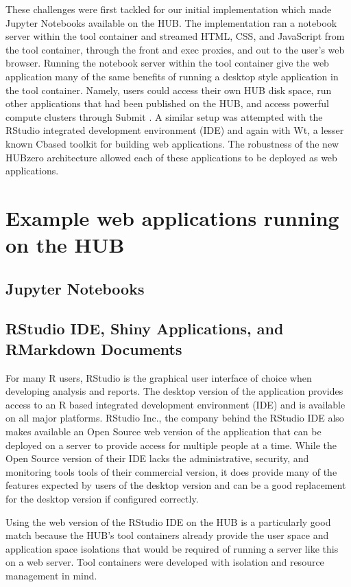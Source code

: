 \documentclass[conference]{../sty/IEEEtran}
\newcommand\CC{C\nolinebreak[4]\hspace{-.05em}\raisebox{.4ex}{\relsize{-3}{\textbf{++}}}\hspace{.25em}}
\begin{document}
These challenges were first tackled for our initial implementation which made
Jupyter Notebooks available on the HUB. The implementation ran a notebook
server within the tool container and streamed HTML, CSS, and JavaScript from
the tool container, through the front and exec proxies, and out to the user's
web browser. Running the notebook server within the tool container give the web
application many of the same benefits of running a desktop style application in
the tool container. Namely, users could access their own HUB disk space, run
other applications that had been published on the HUB, and access powerful
compute clusters through Submit \cite{submit}. A similar setup was attempted
with the RStudio integrated development environment (IDE) and again with Wt, a
lesser known \CC based toolkit for building web applications. The robustness of
the new HUBzero architecture allowed each of these applications to be deployed
as web applications.

\section {Example web applications running on the HUB}

\subsection {Jupyter Notebooks}

\subsection {RStudio IDE, Shiny Applications, and RMarkdown Documents}

For many R users, RStudio is the graphical user interface of choice when
developing analysis and reports. The desktop version of the application
provides access to an R based integrated development environment (IDE) and is
available on all major platforms. RStudio Inc., the company behind the RStudio
IDE also makes available an Open Source web version of the application that can
be deployed on a server to provide access for multiple people at a time. While
the Open Source version of their IDE lacks the administrative, security, and
monitoring tools tools of their commercial version, it does provide many of the
features expected by users of the desktop version and can be a good replacement
for the desktop version if configured correctly.

Using the web version of the RStudio IDE on the HUB is a particularly good
match because the HUB's tool containers already provide the user space and
application space isolations that would be required of running a server like
this on a web server. Tool containers were developed with isolation and
resource management in mind.
\end{document}
